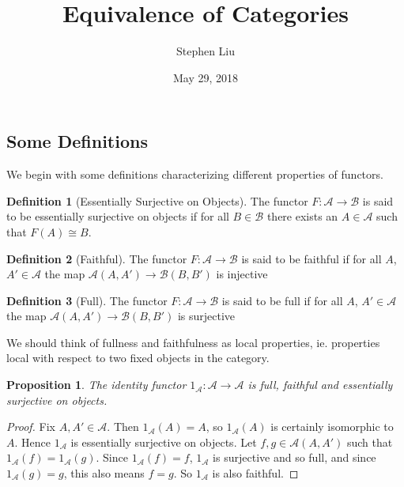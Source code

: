 \documentclass[11pt]{article}
\theoremstyle{definition}
\newtheorem*{defn}{Definition}
\theoremstyle{plain}
\theoremstyle{plain}
\newtheorem{prop}{Proposition}
\theoremstyle{plain}
\begin{document}
\author{Stephen Liu}
\title{Equivalence of Categories}
\date{May 29, 2018}

\maketitle

\subsection*{Some Definitions}

We begin with some definitions characterizing different properties of functors.

\begin{defn}[Essentially Surjective on Objects]
The functor $F:\mathscr{A}\to\mathscr{B}$ is said to be essentially surjective on objects if for all $B\in\mathscr{B} $ there exists an $A\in\mathscr{A}$ such that $F(A)\cong B$.
\end{defn}

\begin{defn}[Faithful]
The functor $F:\mathscr{A}\to\mathscr{B}$ is said to be faithful if for all $A$, $A' \in \mathscr{A}$ the map $\mathscr{A}(A, A') \to \mathscr{B}(B, B')$ is injective
\end{defn}

\begin{defn}[Full]
The functor $F:\mathscr{A}\to\mathscr{B}$ is said to be full if for all $A$, $A' \in \mathscr{A}$ the map $\mathscr{A}(A, A') \to \mathscr{B}(B, B')$ is surjective
\end{defn}

We should think of fullness and faithfulness as local properties, ie. properties local with respect to two fixed objects in the category.

\begin{prop}
The identity functor $1_{\mathscr{A}}:\mathscr{A}\to\mathscr{A}$ is full, faithful and essentially surjective on objects.
\end{prop}

\begin{proof}
Fix $A,A'\in\mathscr{A}$. Then $1_{\mathscr{A}}(A)=A$, so $1_{\mathscr{A}}(A)$ is certainly isomorphic to $A$. Hence $1_{\mathscr{A}}$ is essentially surjective on objects. Let $f,g\in\mathscr{A}(A,A')$ such that $1_{\mathscr{A}}(f)=1_{\mathscr{A}}(g)$. Since $1_{\mathscr{A}}(f)=f$, $1_{\mathscr{A}}$ is surjective and so full, and since $1_{\mathscr{A}}(g)=g$, this also means $f=g$. So $1_{\mathscr{A}}$ is also faithful. 
\end{proof}
\end{document}
